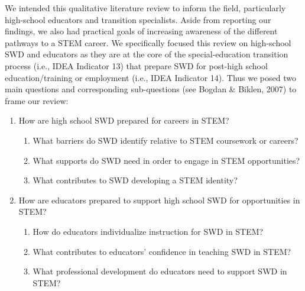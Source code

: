 \documentclass[11.5pt]{sig-alternate}
\begin{document}
\begin{large}
We intended this qualitative literature review to inform the field, particularly high-school educators and transition specialists. Aside from reporting our findings, we also had practical goals of increasing awareness of the different pathways to a STEM career. We specifically focused this review on high-school SWD and educators as they are at the core of the special-education transition process (i.e., IDEA Indicator 13) that prepare SWD for post-high school education/training or employment (i.e., IDEA Indicator 14). Thus we posed two main questions and corresponding sub-questions (see Bogdan \& Biklen, 2007) to frame our review: 
\begin{enumerate}
    \item  	How are high school SWD prepared for careers in STEM?
   \begin{enumerate}
    \item   What barriers do SWD identify relative to STEM coursework or careers?
    \item   What supports do SWD need in order to engage in STEM opportunities?
    \item   What contributes to SWD developing a STEM identity?
   \end{enumerate}
    \item 	How are educators prepared to support high school SWD for opportunities in STEM?
 \begin{enumerate}
    \item    How do educators individualize instruction for SWD in STEM?
    \item   What contributes to educators’ confidence in teaching SWD in STEM?
    \item   What professional development do educators need to support SWD in STEM?
\end{enumerate}
\end{enumerate}

\end{large}
\end{document}
